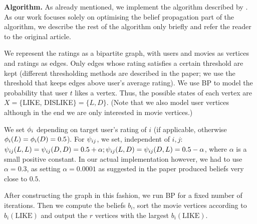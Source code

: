 \documentclass[final,letterpaper]{article}
\newcommand{\mypar}[1]{{\bf #1.}}
\begin{document}
\mypar{Algorithm} As already mentioned, we implement the algorithm described by
\citet{top-n-recommendation}. As our work focuses solely on optimising the
belief propagation part of the algorithm, we describe the rest of the algorithm
only briefly and refer the reader to the original article.

We represent the ratings as a bipartite graph, with users and
movies as vertices and ratings as edges. Only edges whose rating satisfies a
certain threshold are kept (different thresholding methods are described in the
paper; we use the threshold that keeps edges above user's average rating). We use BP to model the probability that user $t$ likes a vertex. Thus,
the possible states of each vertex are $X = \{$LIKE, DISLIKE$\} =
\{L, D\}$. (Note that we also model user vertices although in the end we are
only interested in movie vertices.)

We set $\phi_i$ depending on target user's rating of $i$ (if applicable, otherwise $\phi_i(L) = \phi_i(D) = 0.5$). For $\psi_{ij}$, we set, independent of $i, j$:
$\psi_{ij}(L, L) = \psi_{ij}(D, D) = 0.5 + \alpha; \psi_{ij}(L,
D) = \psi_{ij}(D, L) = 0.5 - \alpha$, where
$\alpha$ is a small positive constant. In our actual implementation however, we had to use $\alpha = 0.3$, as setting $\alpha = 0.0001$ as suggested in the paper produced beliefs very close to $0.5$.

After constructing the graph in this fashion, we run BP for a fixed number of
iterations. Then we compute the beliefs $b_i$, sort the movie
vertices according to $b_i(\text{LIKE})$ and output the $r$ vertices with the
largest $b_i(\text{LIKE})$.
\end{document}
